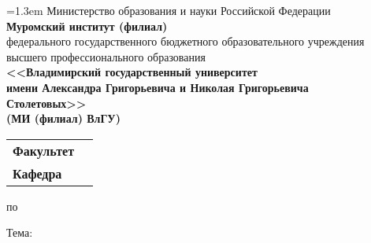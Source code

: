 \newlength{\frontpagefk} %
\setlength{\frontpagefk}{6cm}
\newlength{\frontpagerb} %
\setlength{\frontpagerb}{6cm}
\newlength{\frontpagerbspace} %
\setlength{\frontpagerbspace}{1cm}
\newlength{\FrontPageSubjSpace} %
\setlength{\FrontPageSubjSpace}{1cm}
\newlength{\FrontPageTopicSpace} %
\setlength{\FrontPageTopicSpace}{0.5cm}

\thispagestyle{empty}
\begin{center}
{
\vspace*{-1.5cm}
\baselineskip=1.3em
{\small Министерство образования и науки Российской Федерации}\\
\textbf{Муромский институт (филиал)}\\
{\footnotesize федерального государственного бюджетного образовательного учреждения\\
высшего профессионального образования}\\
\textbf{<<Владимирский государственный университет\\
имени Александра Григорьевича и Николая Григорьевича\\
Столетовых>>\\
(МИ (филиал) ВлГУ)\\}
}

\bigskip
\begin{tabular}{l c}
\textbf{Факультет}&\underline{\makebox[\frontpagefk]{\FrontPageDepartment}}\\
\textbf{Кафедра}&\underline{\makebox[\frontpagefk]{\FrontPageSubdepartment}}\\
\end{tabular}

\vspace{\fill}
\begin{Huge}
\textbf{\textsl{\WorkType}}
\end{Huge}

\vspace{\fill}
по\underline{\makebox[\FrontPageSubjSpace]{}\Subject\makebox[\FrontPageSubjSpace]{}}

\smallskip
Тема:\underline{\makebox[\FrontPageTopicSpace]{}\Topic\makebox[\FrontPageTopicSpace]{}}

\vspace{\fill}

\begin{flushright}


\end{flushright}
\end{center}
